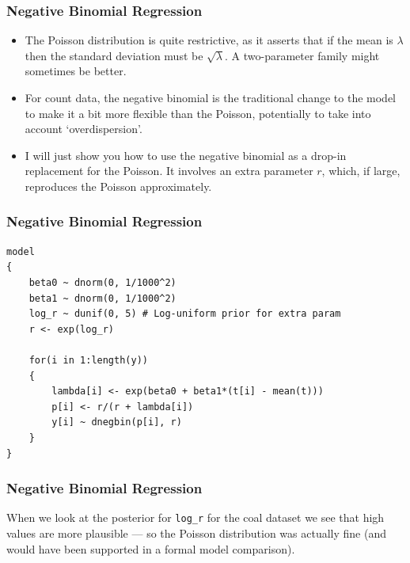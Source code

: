 \documentclass{beamer}
\begin{document}
\begin{frame}
\frametitle{Negative Binomial Regression}
\begin{itemize}
\item The Poisson distribution is quite restrictive, as it asserts that if the
mean is $\lambda$ then the standard deviation must be $\sqrt{\lambda}$.
A two-parameter family might sometimes be better.\pause
\item For count data, the negative binomial is the traditional change to the
model to make it a bit more flexible than the Poisson, potentially to take
into account `overdispersion'.\pause
\item I will just show you how to use the negative binomial as a drop-in
replacement for the Poisson. It involves an extra parameter $r$, which,
if large, reproduces the Poisson approximately.
\end{itemize}

\end{frame}

\begin{frame}[fragile]
\frametitle{Negative Binomial Regression}
\footnotesize
\begin{verbatim}
model
{
    beta0 ~ dnorm(0, 1/1000^2)
    beta1 ~ dnorm(0, 1/1000^2)
    log_r ~ dunif(0, 5) # Log-uniform prior for extra param
    r <- exp(log_r)

    for(i in 1:length(y))
    {
        lambda[i] <- exp(beta0 + beta1*(t[i] - mean(t)))
        p[i] <- r/(r + lambda[i])
        y[i] ~ dnegbin(p[i], r)
    }
}
\end{verbatim}

\end{frame}

\begin{frame}[fragile]
\frametitle{Negative Binomial Regression}
When we look at the posterior for \texttt{log_r} for the coal dataset
we see that high values are more plausible --- so the Poisson distribution
was actually fine (and would have been supported in a formal model comparison).

\end{frame}
\end{document}
